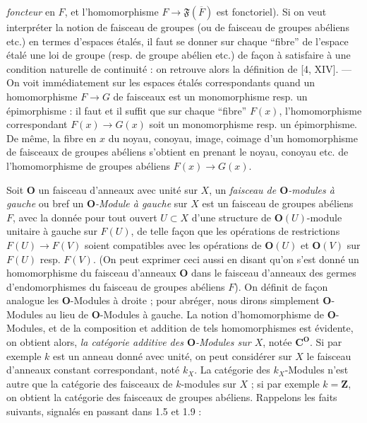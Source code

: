 
\noindent \textit{foncteur} en $F$, et l'homomorphisme
$F\to\mathfrak F(\overline F)$ est fonctoriel). Si on veut
interpréter la notion de faisceau de groupes (ou de faisceau de groupes
abéliens etc.) en termes d'espaces étalés, il faut se donner sur chaque
``fibre'' de l'espace étalé une loi de groupe (resp. de groupe abélien
etc.) de façon à satisfaire à une condition naturelle de continuité : on
retrouve alors la définition de [4, XIV].
--- On voit immédiatement sur les espaces étalés correspondants quand un
homomorphisme $F\to G$ de faisceaux est un monomorphisme resp. un
épimorphisme : il faut et il suffit que sur chaque ``fibre'' $F(x)$,
l'homomorphisme correspondant $F(x)\to G(x)$ soit un
monomorphisme resp. un épimorphisme. De même, la fibre en $x$ du noyau,
conoyau, image, coimage d'un homomorphisme de faisceaux de groupes abéliens
s'obtient en prenant le noyau, conoyau etc. de l'homomorphisme de groupes
abéliens $F(x)\to G(x)$.

Soit $\mathbf O$ un faisceau d'anneaux avec unité sur $X$, un
\textit{faisceau de $\mathbf O$-modules à gauche} ou bref un
\textit{$\mathbf O$-Module à gauche} sur $X$ est un faisceau de groupes abéliens $F$,
avec la donnée pour tout ouvert $U\subset X$ d'une structure de
$\mathbf O(U)$-module unitaire à gauche sur $F(U)$, de telle façon que les
opérations de restrictions $F(U)\to F(V)$ soient compatibles
avec les opérations de $\mathbf O(U)$ et $\mathbf O(V)$ sur $F(U)$ resp.
$F(V)$. (On peut exprimer ceci aussi en disant qu'on s'est donné un
homomorphisme du faisceau d'anneaux $\mathbf O$ dans le faisceau d'anneaux des
germes d'endomorphismes du faisceau de groupes abéliens $F$).
On définit de façon analogue les $\mathbf O$-Modules à droite ; pour abréger,
nous dirons simplement $\mathbf O$-Modules au lieu de $\mathbf O$-Modules à
gauche. La notion d'homomorphisme de $\mathbf O$-Modules, et de la
composition et addition de tels homomorphismes est évidente, on obtient
alors, \textit{la catégorie additive des $\mathbf O$-Modules sur $X$}, notée
$\mathbf C^{\mathbf O}$. Si par exemple $k$ est un anneau donné avec unité, on peut
considérer sur $X$ le faisceau d'anneaux constant correspondant, noté $k_X$.
La catégorie des $k_X$-Modules n'est autre que la catégorie des faisceaux de
$k$-modules sur $X$ ; si par exemple $k=\mathbf Z$, on obtient la catégorie
des faisceaux de groupes abéliens. Rappelons les faits suivants, signalés en
passant dans 1.5 et 1.9 :

